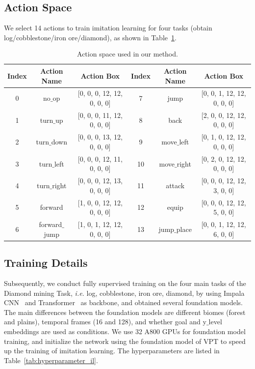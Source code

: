 \begin{onecolumn}
\subsection{Action Space}
We select 14 actions to train imitation learning for four tasks (obtain log/cobblestone/iron ore/diamond), as shown in Table~\ref{tab:action_space}.

\begin{table}[h]
\renewcommand\arraystretch{1.4}
\setlength\tabcolsep{4pt}
\footnotesize
\centering		
\caption{Action space used in our method.}
\label{tab:action_space}
\resizebox{0.75\textwidth}{!}
{
    \begin{tabular}{ccc|ccc}
    \toprule
     \textbf{Index} & \textbf{Action Name} & \textbf{Action Box} & \textbf{Index} & \textbf{Action Name} & \textbf{Action Box} \\
     \hline
     0 & no$\_$op & [0, 0, 0, 12, 12, 0, 0, 0] & 7 & jump  & [0, 0, 1, 12, 12, 0, 0, 0] \\
     1 & turn$\_$up & [0, 0, 0, 11, 12, 0, 0, 0] & 8 & back & [2, 0, 0, 12, 12, 0, 0, 0] \\
     2 & turn$\_$down & [0, 0, 0, 13, 12, 0, 0, 0] & 9 & move$\_$left & [0, 1, 0, 12, 12, 0, 0, 0] \\
     3 & turn$\_$left & [0, 0, 0, 12, 11, 0, 0, 0] & 10 & move$\_$right & [0, 2, 0, 12, 12, 0, 0, 0] \\
     4 & turn$\_$right & [0, 0, 0, 12, 13, 0, 0, 0] & 11 & attack & [0, 0, 0, 12, 12, 3, 0, 0] \\
     5 & forward & [1, 0, 0, 12, 12, 0, 0, 0] & 12 & equip & [0, 0, 0, 12, 12, 5, 0, 0]  \\
     6 & forward$\_$jump & [1, 0, 1, 12, 12, 0, 0, 0] & 13 & jump$\_$place & [0, 0, 1, 12, 12, 6, 0, 0]\\
    
    \bottomrule
    \end{tabular}
} 
\end{table}

\subsection{Training Details}
Subsequently, we conduct fully supervised training on the four main tasks of the Diamond mining Task, \emph{i.e.} log, cobblestone, iron ore, diamond, by using Impala CNN~\cite{espeholt2018impala} and Transformer~\cite{vaswani2017attention} as backbone, and obtained several foundation models. The main differences between the foundation models are different biomes (forest and plains), temporal frames (16 and 128), and whether goal and y$\_$level embeddings are used as conditions. We use 32 A800 GPUs for foundation model training, and initialize the network using the foundation model of VPT to speed up the training of imitation learning. The hyperparameters are listed in Table~\ref{tab:hyperparameter_il}.


\end{onecolumn}
